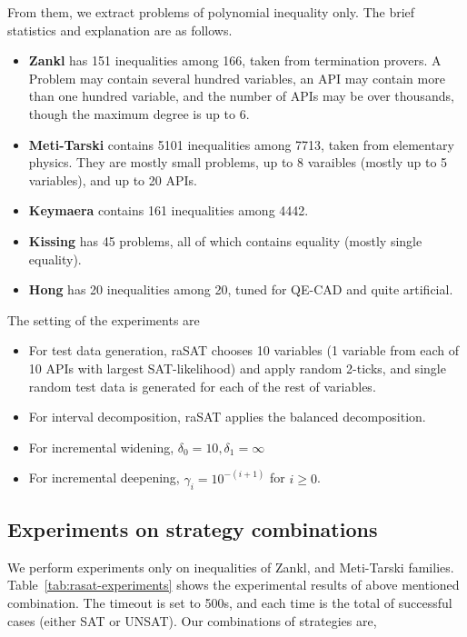 \documentclass[runningheads,a4paper,oribibl]{llncs}
\begin{document}
From them, we extract problems of polynomial inequality only. %
The brief statistics and explanation are as follows. 
\begin{itemize}
\item {\bf Zankl} has 151 inequalities among 166, taken from termination provers. 
A Problem may contain several hundred variables, an API may contain more than one hundred variable, 
and the number of APIs may be over thousands, though the maximum degree is up to $6$. 
\item {\bf Meti-Tarski} contains 5101 inequalities among 7713, taken from elementary physics.
They are mostly small problems, up to 8 varaibles (mostly up to 5 variables), and up to 20 APIs. 
\item {\bf Keymaera} contains 161 inequalities among 4442. 
\item {\bf Kissing} has 45 problems, all of which contains equality (mostly single equality). 
\item {\bf Hong} has 20 inequalities among 20, tuned for QE-CAD and quite artificial. 
\end{itemize}


The setting of the experiments are
\begin{itemize}
\item For test data generation, raSAT chooses 10 variables (1 variable from each of 10 APIs with largest SAT-likelihood) and apply random 2-ticks, and single random test data is generated for each of the rest of variables.
\item For interval decomposition, raSAT applies the balanced decomposition.
\item For incremental widening, $\delta_0 = 10, \delta_1 = \infty$
\item For incremental deepening, $\gamma_i = 10^{-(i+1)}$ for $i \ge 0$.
\end{itemize}


\subsection{Experiments on strategy combinations} \label{sec:expstrategy}

We perform experiments only on inequalities of Zankl, and Meti-Tarski families. 
Table~\ref{tab:rasat-experiments} shows the experimental results of above mentioned combination. 
The timeout is set to 500s, and each time is the total of successful cases 
(either SAT or UNSAT). Our combinations of strategies are,
\end{document}
